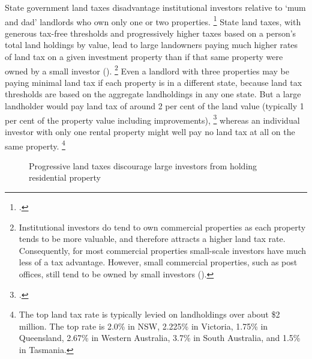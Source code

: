 State government land taxes disadvantage institutional investors relative to `mum and dad' landlords who own only one or two properties.%
	\footcites[][Volume~1, pp.~261--262]{HenryTaxReview2010}[][15]{DaleyCoates-2015-Property-taxes}[][14]{mclaren2014uniform}[][69]{Hulse-etal-2011-AHURI-Secure-occupancy-rental-housing}
State land taxes, with generous tax-free thresholds and progressively higher taxes based on a person's total land holdings by value, lead to large landowners paying much higher rates of land tax on a given investment property than if that same property were owned by a small investor ().%
    \footnote{Institutional investors do tend to own commercial properties as each property tends to be more valuable, and therefore attracts a higher land tax rate.
    Consequently, for most commercial properties small-scale investors have much less of a tax advantage. However, small commercial properties, such as post offices, still tend to be owned by small investors (\textcite{Prosper_2014_Freebairn_speech_press_release}).}
Even a landlord with three properties may be paying minimal land tax if each property is in a different state, because land tax thresholds are based on the aggregate landholdings in any one state.
But a large landholder would pay land tax of around 2 per cent of the land value (typically 1 per cent of the property value including improvements),%
	\footcite{DaleyCoates-2015-Property-taxes}
whereas an individual investor with only one rental property might well pay no land tax at all on the same property.%
	\footnote{The top land tax rate is typically levied on landholdings over about \$2 million. The top rate is 2.0\% in NSW, 2.225\% in Victoria, 1.75\% in Queensland, 2.67\% in Western Australia, 3.7\% in South Australia, and 1.5\% in Tasmania.}


\begin{figure}
\caption{Progressive land taxes discourage large investors from holding residential property}\label{fig:land-tax-investors}
\end{figure}

